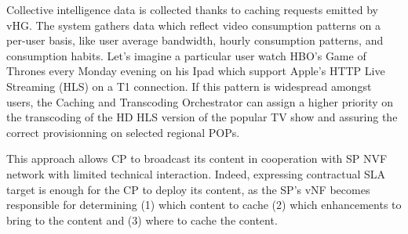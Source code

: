 Collective intelligence data is collected thanks to caching requests emitted by vHG.
The system gathers data which reflect video consumption patterns on a per-user basis, like user average bandwidth, hourly consumption patterns, and consumption habits.
Let's imagine a particular user watch HBO's Game of Thrones every Monday evening on his Ipad which support Apple's HTTP Live Streaming (HLS) on a T1 connection.
If this pattern is widespread amongst users, the Caching and Transcoding Orchestrator can assign a higher priority on the transcoding of the HD HLS version of the popular TV show and assuring the correct provisionning on selected regional POPs.

This approach allows CP to broadcast its content in cooperation with SP NVF network with limited technical interaction.
Indeed, expressing contractual SLA target is enough for the CP to deploy its content, as the SP's vNF becomes responsible for determining (1) which content to cache (2) which enhancements to bring to the content and (3) where to cache the content.


